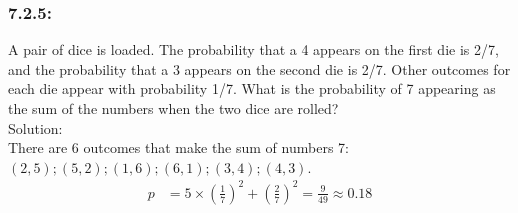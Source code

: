 \documentclass[a4paper]{article}
\begin{document}
\subsubsection*{7.2.5:} A pair of dice is loaded. The probability that a 4 appears on the first die is 2/7, and the probability that a 3 appears on the second die is 2/7. Other outcomes for each die appear with probability 1/7. What is the probability of 7 appearing as the sum of the numbers when the two dice are rolled? \\
\textit{}{Solution:} \\
There are 6 outcomes that make the sum of numbers 7: $(2,5);(5,2);(1,6);(6,1);(3,4);(4,3)$. \\
\begin{align*}
	p & = 5\times (\frac{1}{7})^{2} + (\frac{2}{7})^{2} = \frac{9}{49} \approx 0.18  
\end{align*}
\end{document}
